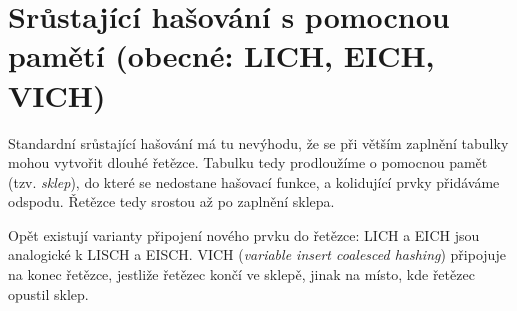 \def\xx{
\subsection{Algoritmus MEMBER}
\subsection{Algoritmus INSERT LISCH}
\subsection{Algoritmus INSERT EISCH}
\subsection{Očekávaný počet testů}
(Jenom citace věty z~\cite{Vitter-Chen})
}

\section{Srůstající hašování s pomocnou pamětí (obecné: LICH, EICH, VICH)}

Standardní srůstající hašování má tu nevýhodu, že se při větším
zaplnění tabulky mohou vytvořit dlouhé řetězce. Tabulku tedy prodloužíme o
pomocnou pamět (tzv. \emph{sklep}), do které se nedostane hašovací funkce, a
kolidující prvky přidáváme odspodu. Řetězce tedy srostou až po
zaplnění sklepa.

Opět existují varianty připojení nového prvku do řetězce: LICH a EICH
jsou analogické k LISCH a EISCH. VICH (\emph{variable insert coalesced
hashing}) připojuje na konec řetězce, jestliže řetězec končí ve sklepě,
jinak na místo, kde řetězec opustil sklep.

\pagebreak

